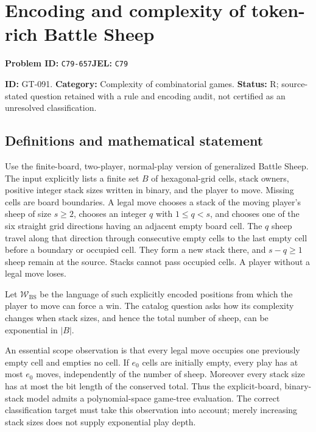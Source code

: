\documentclass[11pt,a4paper]{article}
\begin{document}
\section*{Encoding and complexity of token-rich Battle Sheep}
\textbf{Problem ID:} \texttt{C79-657}\quad \textbf{JEL:} \texttt{C79}\par
\label{problem:OP-0221}
\label{game:GT-091}
{\sffamily\small\color{muted}
\noindent\textbf{ID:} GT-091. \textbf{Category:} Complexity of combinatorial games.
\textbf{Status:} R; source-stated question retained with a rule and encoding audit, not certified as an unresolved classification.
\par}
\subsection*{Definitions and mathematical statement}
Use the finite-board, two-player, normal-play version of generalized Battle Sheep. The input explicitly lists a finite set $B$ of hexagonal-grid cells, stack owners, positive integer stack sizes written in binary, and the player to move. Missing cells are board boundaries. A legal move chooses a stack of the moving player's sheep of size $s\geq2$, chooses an integer $q$ with $1\leq q<s$, and chooses one of the six straight grid directions having an adjacent empty board cell. The $q$ sheep travel along that direction through consecutive empty cells to the last empty cell before a boundary or occupied cell. They form a new stack there, and $s-q\geq1$ sheep remain at the source. Stacks cannot pass occupied cells. A player without a legal move loses.

Let $\mathcal W_{\mathrm{BS}}$ be the language of such explicitly encoded positions from which the player to move can force a win. The catalog question asks how its complexity changes when stack sizes, and hence the total number of sheep, can be exponential in $|B|$.

An essential scope observation is that every legal move occupies one previously empty cell and empties no cell. If $e_0$ cells are initially empty, every play has at most $e_0$ moves, independently of the number of sheep. Moreover every stack size has at most the bit length of the conserved total. Thus the explicit-board, binary-stack model admits a polynomial-space game-tree evaluation. The correct classification target must take this observation into account; merely increasing stack sizes does not supply exponential play depth.
\end{document}
